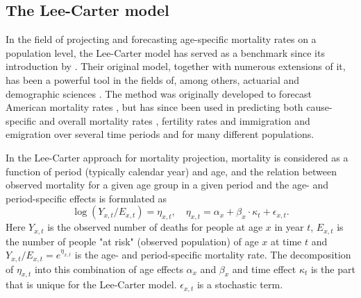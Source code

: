 \subsection{The Lee-Carter model}
\label{section:Lee-Carter}
In the field of projecting and forecasting age-specific mortality rates on a population level, the Lee-Carter model has served as a benchmark since its introduction by \textcite{LeeCarter1992}. Their original model, together with numerous extensions of it, has been a powerful tool in the fields of, among others, actuarial and demographic sciences \parencite{booth_tickle_2008}. The method was originally developed to forecast American mortality rates \parencite{LeeCarter1992}, but has since been used in predicting both cause-specific and overall mortality rates \parencite{GirosiKing2007}, fertility rates and immigration and emigration \parencite{Wisniowski2015} over several time periods and for many different populations. 

\newpar In the Lee-Carter approach for mortality projection, mortality is considered as a function of period (typically calendar year) and age, and the relation between observed mortality for a given age group in a given period and the age- and period-specific effects is formulated as 
\begin{equation}
\log(Y_{x,t}/E_{x,t})  = \eta_{x,t}, \quad \eta_{x,t}= \alpha_x + \beta_x\cdot\kappa_t + \epsilon_{x,t}.
\label{eq:orig-LC-model}
\end{equation}
Here $Y_{x,t}$ is the observed number of deaths for people at age $x$ in year $t$, $E_{x,t}$ is the number of people "at risk" (observed population) of age $x$ at time $t$ and $Y_{x,t}/E_{x,t} = e^{\eta_{x,t}}$ is the age- and period-specific mortality rate. The decomposition of $\eta_{x,t}$ into this combination of age effects $\alpha_x$ and $\beta_x$ and time effect $\kappa_t$ is the part that is unique for the Lee-Carter model. $\epsilon_{x,t}$ is a stochastic term.

